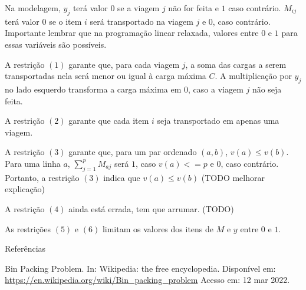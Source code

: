 \documentclass{article}
\begin{document}
Na modelagem, 
$y_j$ terá valor $0$ se a viagem $j$ não for feita e $1$
caso contrário.
$M_{ij}$ terá valor $0$ se o item $i$ será transportado na viagem $j$
e $0$, caso contrário. Importante lembrar que na programação linear 
relaxada, valores entre $0$ e $1$ para essas variáveis são possíveis.

A restrição $(1)$ garante que, para cada viagem $j$, a soma das cargas a serem transportadas nela será menor ou igual à carga máxima $C$. A multiplicação por $y_j$ no lado esquerdo transforma a carga máxima em $0$, caso a viagem $j$ não seja feita.

A restrição $(2)$ garante que cada item $i$ seja transportado em apenas uma viagem.

A restrição $(3)$ garante que, para um par ordenado $(a,b)$, $v(a) \le v(b)$. Para uma linha $a$, $\sum_{j=1}^p M_{aj}$ será $1$, caso $v(a) <= p$ e $0$, caso contrário. Portanto, a restrição $(3)$ indica que $v(a) \le v(b)$ (TODO melhorar explicação)

A restrição $(4)$ ainda está errada, tem que arrumar. (TODO)

As restrições $(5)$ e $(6)$ limitam os valores dos itens de $M$ e $y$
entre $0$ e $1$.

\begin{section}{Referências}

Bin Packing Problem. In: Wikipedia: the free encyclopedia. Disponível em: \url{https://en.wikipedia.org/wiki/Bin_packing_problem} Acesso em: 12 mar 2022. 

\end{section}
\end{document}
